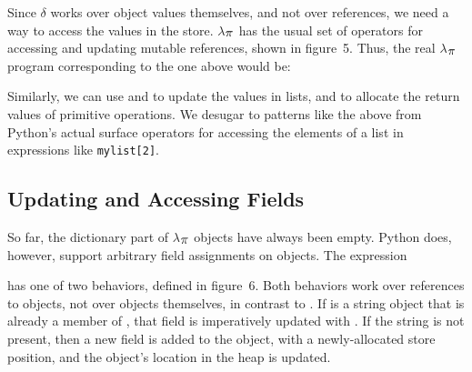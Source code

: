 \documentclass[10pt]{sigplanconf}
\newcommand{\Scribtexttt}[1]{{\texttt{#1}}}
\newcommand{\textsub}[1]{$_{\hbox{\textsmaller{#1}}}$}
\newcommand{\Larger}[1]{\textlarger{#1}}
\newenvironment{SCentered}{\begin{trivlist}\item \centering}{\end{trivlist}}
\let\SOriginalthesubsubsection\thesubsubsection
\newcommand{\Ssubsection}[2]{\subsection[#1]{#2}\let\thesubsubsection\SOriginalthesubsubsection}
\newcommand{\FigureRef}[2]{#1}
\begin{document}
\noindent Since $\delta$ works over object values themselves, and not over references, we need
a way to access the values in the store.  $\lambda$\textsub{\Larger{$\pi$}} has the usual set of
operators for accessing and updating mutable references, shown in
figure~\FigureRef{5}{t:x28counter_x28x22figurex22_x22fx3areferencesx22x29x29}.  Thus, the real $\lambda$\textsub{\Larger{$\pi$}} program
corresponding to the one above would be:


\noindent \begin{SCentered}\end{SCentered}

\noindent Similarly, we can use  and  to update the values
in lists, and to allocate the return values of primitive operations.  We
desugar to patterns like the above from Python{'}s actual surface operators for
accessing the elements of a list in expressions like \Scribtexttt{mylist[2]}.

\Ssubsection{Updating and Accessing Fields}{Updating and Accessing Fields}\label{t:x28part_x22Updatingx5fandx5fAccessingx5fFieldsx22x29}

So far, the dictionary part of $\lambda$\textsub{\Larger{$\pi$}} objects have always been empty.
Python does, however, support arbitrary field assignments on objects.  The
expression


\noindent \begin{SCentered}\end{SCentered}

\noindent has one of two behaviors, defined in figure~\FigureRef{6}{t:x28counter_x28x22figurex22_x22fx3asimplex2dobjsx22x29x29}.  Both
behaviors work over references to objects, not over objects themselves, in
contrast to .  If  is a string object that is already a
member of , that field is imperatively updated with .  If the string is not present, then a new field is added to the object,
with a newly{-}allocated store position, and the object{'}s location in the heap is
updated.
\end{document}
